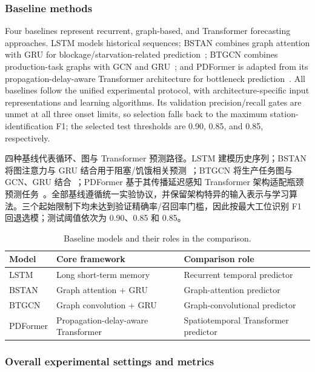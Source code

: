 \documentclass[a4paper,fleqn]{cas-dc}
\newcommand{\zhpara}[1]{%
  \par\begingroup\small\color{black!72}\noindent #1\par\endgroup}
\begin{document}
\subsubsection{Baseline methods}

Four baselines represent recurrent, graph-based, and Transformer forecasting approaches. LSTM models historical sequences; BSTAN combines graph attention with GRU for blockage/starvation-related prediction~\cite{lai2023bstan}; BTGCN combines production-task graphs with GCN and GRU~\cite{yin2025btgcn}; and PDFormer is adapted from its propagation-delay-aware Transformer architecture for bottleneck prediction~\cite{jiang2023pdformer}. All baselines follow the unified experimental protocol, with architecture-specific input representations and learning algorithms. Its validation precision/recall gates are unmet at all three onset limits, so selection falls back to the maximum station-identification F1; the selected test thresholds are 0.90, 0.85, and 0.85, respectively.

\zhpara{四种基线代表循环、图与 Transformer 预测路径。LSTM 建模历史序列；BSTAN 将图注意力与 GRU 结合用于阻塞/饥饿相关预测~\cite{lai2023bstan}；BTGCN 将生产任务图与 GCN、GRU 结合~\cite{yin2025btgcn}；PDFormer 基于其传播延迟感知 Transformer 架构适配瓶颈预测任务~\cite{jiang2023pdformer}。全部基线遵循统一实验协议，并保留架构特异的输入表示与学习算法。三个起始限制下均未达到验证精确率/召回率门槛，因此按最大工位识别 F1 回退选模；测试阈值依次为 0.90、0.85 和 0.85。}


\begin{table}[pos=!htbp]
\centering
\caption{Baseline models and their roles in the comparison.}
\label{tab:exp-baselines}
\scriptsize
\setlength{\tabcolsep}{4pt}
\renewcommand{\arraystretch}{1.10}
\begin{tabularx}{\columnwidth}{@{}lXX@{}}
\toprule
Model & Core framework & Comparison role \\
\midrule
LSTM & Long short-term memory & Recurrent temporal predictor \\
BSTAN & Graph attention + GRU & Graph-attention predictor \\
BTGCN & Graph convolution + GRU & Graph-convolutional predictor \\
PDFormer & Propagation-delay-aware Transformer & Spatiotemporal Transformer predictor \\
\bottomrule
\end{tabularx}
\end{table}

\subsubsection{Overall experimental settings and metrics}
\end{document}
